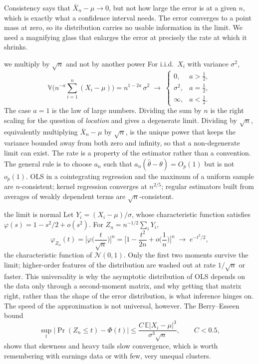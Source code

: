 \documentclass[11pt,a4paper]{article}
\newcommand{\E}{\mathbb{E}}
\newcommand{\V}{\mathbb{V}}
\newcommand{\N}{\mathcal{N}}
\newcommand{\op}{o_p}
\newcommand{\Op}{O_p}
\newcommand{\iid}{i.i.d.}
\begin{document}
Consistency says that $\bar X_n-\mu\to0$, but not how large the error is at a given $n$, which is exactly what a confidence interval needs. The error converges to a point mass at zero, so its distribution carries no usable information in the limit. We need a magnifying glass that enlarges the error at precisely the rate at which it shrinks.

\begin{whybox}{we multiply by $\sqrt n$ and not by another power}
For \iid\ $X_i$ with variance $\sigma^2$,
\[
\V\Big(n^{-a}\sum_{i=1}^n(X_i-\mu)\Big)=n^{1-2a}\,\sigma^2\;\longrightarrow\;
\begin{cases}
0, & a>\tfrac12,\\[2pt]
\sigma^2, & a=\tfrac12,\\[2pt]
\infty, & a<\tfrac12 .
\end{cases}
\]
The case $a=1$ is the law of large numbers. Dividing the sum by $n$ is the right scaling for the question of \emph{location} and gives a degenerate limit. Dividing by $\sqrt n$, equivalently multiplying $\bar X_n-\mu$ by $\sqrt n$, is the unique power that keeps the variance bounded away from both zero and infinity, so that a non-degenerate limit can exist. The rate is a property of the estimator rather than a convention. The general rule is to choose $a_n$ such that $a_n(\hat\theta-\theta)=\Op(1)$ but is not $\op(1)$. OLS in a cointegrating regression and the maximum of a uniform sample are $n$-consistent; kernel regression converges at $n^{2/5}$; regular estimators built from averages of weakly dependent terms are $\sqrt n$-consistent.
\end{whybox}

\begin{whybox}{the limit is normal}
Let $Y_i=(X_i-\mu)/\sigma$, whose characteristic function satisfies $\varphi(s)=1-s^2/2+o(s^2)$. For $Z_n=n^{-1/2}\sum_iY_i$,
\[
\varphi_{Z_n}(t)=\Big[\varphi\Big(\frac{t}{\sqrt n}\Big)\Big]^n=\Big[1-\frac{t^2}{2n}+o\Big(\frac1n\Big)\Big]^n\;\longrightarrow\;e^{-t^2/2},
\]
the characteristic function of $\N(0,1)$. Only the first two moments survive the limit; higher-order features of the distribution are washed out at rate $1/\sqrt n$ or faster. This universality is why the asymptotic distribution of OLS depends on the data only through a second-moment matrix, and why getting that matrix right, rather than the shape of the error distribution, is what inference hinges on. The speed of the approximation is not universal, however. The Berry--Esseen bound
\[
\sup_t\big|\Pr(Z_n\leq t)-\Phi(t)\big|\leq\frac{C\,\E|X_i-\mu|^3}{\sigma^3\sqrt n},\qquad C<0.5,
\]
shows that skewness and heavy tails slow convergence, which is worth remembering with earnings data or with few, very unequal clusters.
\end{whybox}
\end{document}
